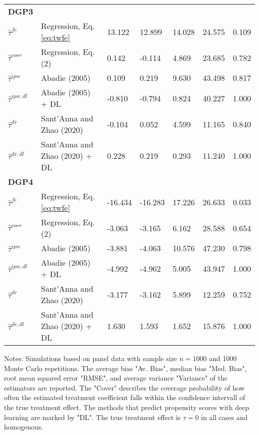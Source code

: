 \begin{table}[htbp]
{\begin{threeparttable}
\begin{tabular}{lllllll}
\addlinespace
\large \textbf{DGP3}            &                                   &            &             &      &           \\
\addlinespace
$\hat{\tau}^{fe}$ & Regression, Eq. \eqref{eq:twfe}               & 13.122       & 12.899       & 14.028 & 24.575 & 0.109    \\
$\hat{\tau}^{corr}$ & Regression, Eq. (2)             & 0.142       & -0.114       & 4.869 & 23.685 &0.782   \\
$\hat{\tau}^{ipw}$ & Abadie (2005)                    & 0.109     & 0.219      & 9.630 & 43.498  & 0.817   \\
$\hat{\tau}^{ipw,dl}$ & Abadie (2005) + DL            & -0.810       & -0.794        & 0.824 & 40.227  &   1.000  \\
$\hat{\tau}^{dr}$ & Sant'Anna and Zhao (2020)         & -0.104       & 0.052        & 4.599 & 11.165  &0.840    \\
$\hat{\tau}^{dr,dl}$ & Sant'Anna and Zhao (2020) + DL & 0.228       & 0.219        & 0.293 & 11.240   &1.000   \\  \midrule


\addlinespace
\large \textbf{DGP4}            &                                   &            &             &      &           \\
\addlinespace
$\hat{\tau}^{fe}$ & Regression, Eq. \eqref{eq:twfe}              & -16.434       & -16.283        & 17.226 & 26.633  & 0.033   \\
$\hat{\tau}^{corr}$ & Regression, Eq. (2)             & -3.063       & -3.165       & 6.162 & 28.588  &0.654   \\
$\hat{\tau}^{ipw}$ & Abadie (2005)                    & -3.881       & -4.063        & 10.576 & 47.230    & 0.798  \\
$\hat{\tau}^{ipw,dl}$ & Abadie (2005) + DL            & -4.992       & -4.962        & 5.005 & 43.947 & 1.000     \\
$\hat{\tau}^{dr}$ & Sant'Anna and Zhao (2020)         &-3.177      &-3.162       & 5.899 & 12.259  &0.752    \\
$\hat{\tau}^{dr,dl}$ & Sant'Anna and Zhao (2020) + DL & 1.630       & 1.593        & 1.652 & 15.876  &1.000    \\


\bottomrule
\end{tabular}
\vspace{1em}
\begin{tablenotes}
\item Notes: Simulations based on panel data with sample size $n = 1000$ and 1000 Monte Carlo repetitions. The average bias "Av. Bias", median bias "Med. Bias", root mean squared error "RMSE", and average variance "Variance" of the estimators are reported. The "Cover" describes the coverage probability of how often the estimated treatment coefficient falls within the confidence intervall of the true treatment effect. The methods that predict propensity scores with deep learning are marked by "DL". The true treatment effect is $\tau = 0$ in all cases and homogenous.
\end{tablenotes}
\end{threeparttable}}
\end{table}

